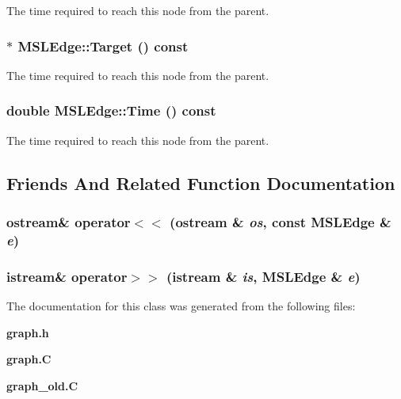 The time required to reach this node from the parent.

\subsubsection{$\ast$ MSLEdge::Target () const\hspace{0.3cm}{\tt  [inline]}}\label{classMSLEdge_a10}


The time required to reach this node from the parent.

\subsubsection{\setlength{\rightskip}{0pt plus 5cm}double MSLEdge::Time () const\hspace{0.3cm}{\tt  [inline]}}\label{classMSLEdge_a5}


The time required to reach this node from the parent.



\subsection{Friends And Related Function Documentation}
\subsubsection{\setlength{\rightskip}{0pt plus 5cm}ostream\& operator$<$$<$ (ostream \& {\em os}, const MSLEdge \& {\em e})\hspace{0.3cm}{\tt  [friend]}}\label{classMSLEdge_l1}


\subsubsection{\setlength{\rightskip}{0pt plus 5cm}istream\& operator$>$$>$ (istream \& {\em is}, MSLEdge \& {\em e})\hspace{0.3cm}{\tt  [friend]}}\label{classMSLEdge_l0}




The documentation for this class was generated from the following files:\begin{CompactItemize}
\item 
{\bf graph.h}\item 
{\bf graph.C}\item 
{\bf graph\_\-old.C}\end{CompactItemize}
